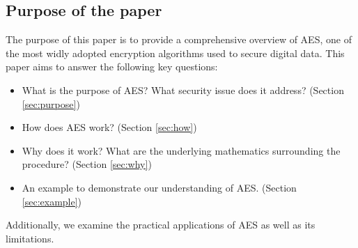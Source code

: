 \subsection{Purpose of the paper}

The purpose of this paper is to provide a comprehensive overview of \gls{AES}, one of the most widly adopted encryption algorithms used to secure digital data.
This paper aims to answer the following key questions:
\begin{itemize}
    \item What is the purpose of \gls{AES}? What security issue does it address? (Section \ref{sec:purpose})
    \item How does \gls{AES} work? (Section \ref{sec:how})
    \item Why does it work? What are the underlying mathematics surrounding the procedure?  (Section \ref{sec:why})
    \item An example to demonstrate our understanding of \gls{AES}. (Section \ref{sec:example})
\end{itemize}
Additionally, we examine the practical applications of \gls{AES} as well as its limitations.

